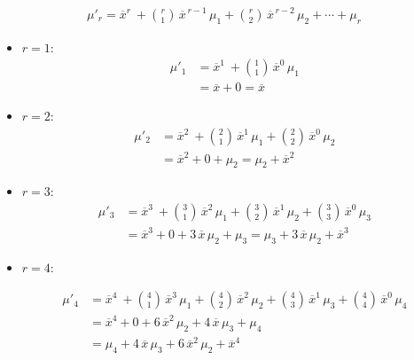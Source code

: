 \documentclass[twoside]{book}
\begin{document}
\begin{textbox}
    \begin{align*}
        \mu'_r = \overline{x}^r\
+ \binom{r}{1}\,\overline{x}^{\,r-1}\,\mu_1
+ \binom{r}{2}\,\overline{x}^{\,r-2}\,\mu_2
+ \cdots
+ \mu_r
    \end{align*}
\end{textbox}

\begin{itemize}
  \item \(r=1:\)
    \begin{align*}
      \mu'_1
      &= \overline{x}^1\ + \binom{1}{1}\,\overline{x}^0\,\mu_1 \\
      &= \overline{x} + 0
      = \overline{x}
    \end{align*}
  
  \item \(r=2:\)
    \begin{align*}
      \mu'_2
      &= \overline{x}^2\
         + \binom{2}{1}\,\overline{x}^1\,\mu_1
         + \binom{2}{2}\,\overline{x}^0\,\mu_2 \\
      &= \overline{x}^2 + 0 + \mu_2
      = \mu_2 + \overline{x}^2
    \end{align*}
  
  \item \(r=3:\)
    \begin{align*}
      \mu'_3
      &= \overline{x}^3\
         + \binom{3}{1}\,\overline{x}^2\,\mu_1
         + \binom{3}{2}\,\overline{x}^1\,\mu_2
         + \binom{3}{3}\,\overline{x}^0\,\mu_3 \\
      &= \overline{x}^3 + 0 + 3\,\overline{x}\,\mu_2 + \mu_3
      = \mu_3 + 3\,\overline{x}\,\mu_2 + \overline{x}^3
    \end{align*}
  
  \item \(r=4:\)
    
    \begin{align*}
      \mu'_4
      &= \overline{x}^4\
         + \binom{4}{1}\,\overline{x}^3\,\mu_1
         + \binom{4}{2}\,\overline{x}^2\,\mu_2
         + \binom{4}{3}\,\overline{x}^1\,\mu_3
         + \binom{4}{4}\,\overline{x}^0\,\mu_4 \\
      &= \overline{x}^4 + 0 + 6\,\overline{x}^2\,\mu_2 + 4\,\overline{x}\,\mu_3 + \mu_4 \\
      &= \mu_4 + 4\,\overline{x}\,\mu_3 + 6\,\overline{x}^2\,\mu_2 + \overline{x}^4
    \end{align*}
\end{itemize}
\end{document}
